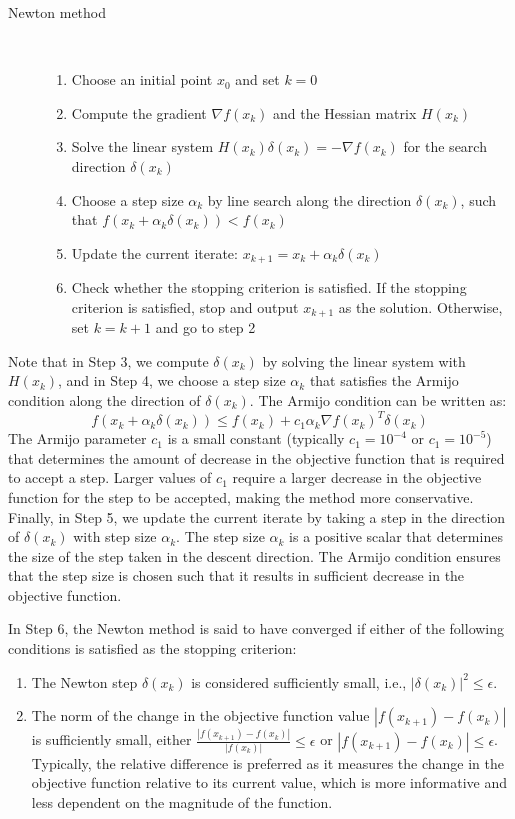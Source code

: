 \documentclass  [
  paper    = a4,
  BCOR     = 10mm,
  twoside,
  fontsize = 12pt,
  fleqn,
  toc      = bibnumbered,
  toc      = listofnumbered,
  numbers  = noendperiod,
  headings = normal,
  listof   = leveldown,
  version  = 3.03
]                                       {scrreprt}
\newcommand{\<}{\langle}
\renewcommand{\>}{\rangle}
\begin{document}
\begin{description}
	\item[Newton method]\ 
    \begin{enumerate}		
		\item Choose an initial point $x_0$ and set $k=0$
		\item Compute the gradient $\nabla f(x_k)$ and the Hessian matrix $H(x_k)$
		\item Solve the linear system $H(x_k) \delta(x_k) = -\nabla f(x_k)$ for the search direction $\delta(x_k)$
		\item Choose a step size $\alpha_k$ by line search along the direction $\delta(x_k)$, such that $f(x_k + \alpha_k \delta(x_k)) < f(x_k)$
		\item Update the current iterate: $x_{k+1} = x_k + \alpha_k \delta(x_k)$
		\item Check whether the stopping criterion is satisfied. If the stopping criterion is satisfied, stop and output $x_{k+1}$ as the solution. Otherwise, set $k=k+1$ and go to step 2
	\end{enumerate}
\end{description}

Note that in Step 3, we compute $\delta(x_k)$ by solving the linear system with $H(x_k)$, and in Step 4, we choose a step size $ \alpha_k$ that satisfies the Armijo condition along the direction of $\delta(x_k)$. The Armijo condition can be written as:
$$f(x_k + \alpha_k \delta(x_k)) \leq f(x_k) + c_1 \alpha_k \nabla f(x_k)^T \delta(x_k)$$
The Armijo parameter $c_1$ is a small constant (typically $c_1=10^{-4}$ or $c_1=10^{-5}$) that determines the amount of decrease in the objective function that is required to accept a step. Larger values of $c_1$ require a larger decrease in the objective function for the step to be accepted, making the method more conservative. Finally, in Step 5, we update the current iterate by taking a step in the direction of $\delta(x_k)$ with step size $\alpha_k$. The step size $\alpha_k$ is a positive scalar that determines the size of the step taken in the descent direction. The Armijo condition ensures that the step size is chosen such that it results in sufficient decrease in the objective function. 

In Step 6, the Newton method is said to have converged if either of the following conditions is satisfied as the stopping criterion:
\begin{enumerate}
	\item The Newton step $\delta(x_k)$ is considered sufficiently small, i.e., $|\delta(x_k)|^2 \leq \epsilon$.
	\item The norm of the change in the objective function value $|f(x_{k+1}) - f(x_k)|$ is sufficiently small, either $\frac{\left| f(x_{k+1}) - f(x_{k}) \right|}{\left| f(x_{k}) \right|} \leq \epsilon$ or $\left| f(x_{k+1}) - f(x_{k}) \right| \leq \epsilon$. Typically, the relative difference is preferred as it measures the change in the objective function relative to its current value, which is more informative and less dependent on the magnitude of the function.
\end{enumerate}
\end{document}
